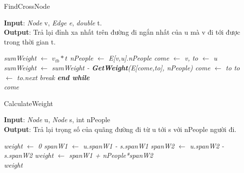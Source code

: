 \documentclass{article}
\begin{document}
    \begin{algorithm}
        \caption{FindCrossNode}
        \textbf{Input}: \textit{Node} v, \textit{Edge e}, \textit{double} t.\\
        \textbf{Output}: Trả lại đỉnh xa nhất trên đường đi ngắn nhất của u mà v 
        đi tới được trong thời gian t.
        \begin{algorithmic}
            \em
            \State sumWeight $\gets$ $v_{tb}*t$ 
            \State nPeople $\gets$ E[v,u].nPeople
            \State come $\gets$ v, to $\gets$ u
            \State sumWeight $\gets$ sumWeight - \textbf{GetWeight}(E[come,to], nPeople)
            \State come $\gets$ to 
            \State to $\gets$ to.next
             break
            \EndIf
            \EndWhile 
            \textbf{end while} \\
            \Return come
            \EndProcedure
        \end{algorithmic}
    \end{algorithm}

    \begin{algorithm}
        \caption{CalculateWeight}
        \textbf{Input}: \textit{Node} u, \textit{Node} s, int nPeople \\
        \textbf{Output}: Trả lại trọng số của quãng đường đi từ u tới s với 
        nPeople người đi.
        \begin{algorithmic}
            \em
            \State weight $\gets$ 0
            \State spanW1 $\gets$ u.spanW1 - s.spanW1
            \State spanW2 $\gets$ u.spanW2 - s.spanW2 
            \State weight $\gets$ spanW1 + nPeople*spanW2 \\
            \Return weight
            \EndProcedure
        \end{algorithmic}
    \end{algorithm}
\end{document}

